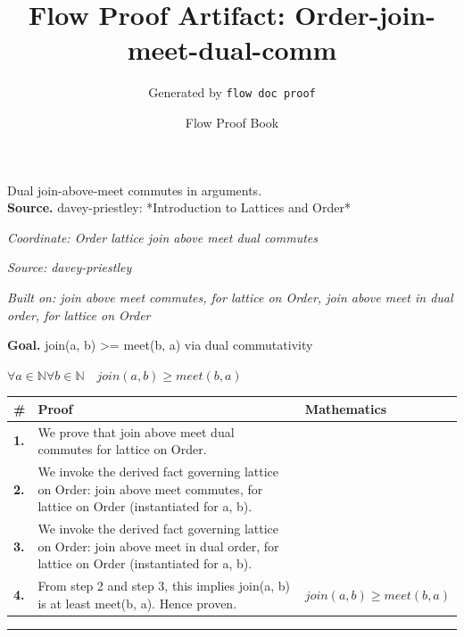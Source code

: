\documentclass[11pt]{article}
\title{Flow Proof Artifact: Order-join-meet-dual-comm}
\author{Generated by \texttt{flow doc proof}}
\date{Flow Proof Book}
\theoremstyle{definition}
\begin{document}
\maketitle
Dual join-above-meet commutes in arguments.\\[0.5em]
\textbf{Source.} davey-priestley: *Introduction to Lattices and Order*\\[0.5em]
\bigskip
{}\par
\smallskip\noindent\textit{Coordinate: Order \cdot lattice \cdot join above meet dual commutes}\par
\smallskip\noindent\textit{Source: davey-priestley}\par
\smallskip\noindent\textit{Built on: join above meet commutes, for lattice on Order, join above meet in dual order, for lattice on Order}\par
\medskip
\noindent\textbf{Goal.} join(a, b) >= meet(b, a) via dual commutativity\par
\noindent$\displaystyle \forall a \in \mathbb{N} \forall b \in \mathbb{N}\quad join(a, b) \ge meet(b, a)$\par
\medskip
\noindent
\begin{tabular}{@{} >{\raggedright\arraybackslash}p{} >{\raggedright\arraybackslash}p{} >{\raggedleft\arraybackslash}p{} @{}}
\textbf{\#} & \textbf{Proof} & \textbf{Mathematics} \\
\midrule
\textbf{1.} & We prove that join above meet dual commutes for lattice on Order. & \\[0.45em]
\textbf{2.} & We invoke the derived fact governing lattice on Order: join above meet commutes, for lattice on Order (instantiated for a, b). & \\[0.45em]
\textbf{3.} & We invoke the derived fact governing lattice on Order: join above meet in dual order, for lattice on Order (instantiated for a, b). & \\[0.45em]
\textbf{4.} & From step 2 and step 3, this implies join(a, b) is at least meet(b, a). Hence proven. & $\displaystyle join(a, b) \ge meet(b, a)$ \\[0.45em]
\bottomrule
\end{tabular}
\label{thm:Order-lattice-join_above_meet_dual_commutes}
\par\medskip\hrule
\end{document}
